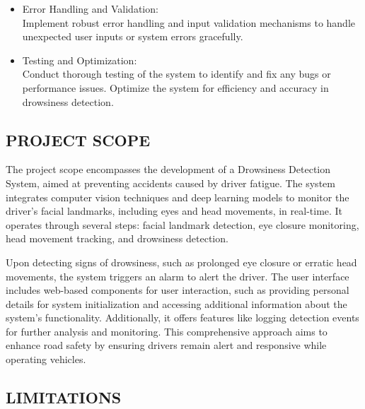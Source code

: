 \documentclass[12pt]{article}
\begin{document}
\begin{itemize}
\item Error Handling and Validation:\\ Implement robust error handling and input validation mechanisms to handle unexpected user inputs or system errors gracefully.

\item Testing and Optimization:\\ Conduct thorough testing of the system to identify and fix any bugs or performance issues. Optimize the system for efficiency and accuracy in drowsiness detection.
\end{itemize}

\subsection{PROJECT SCOPE }

The project scope encompasses the development of a Drowsiness Detection System, aimed at preventing accidents caused by driver fatigue. The system integrates computer vision techniques and deep learning models to monitor the driver's facial landmarks, including eyes and head movements, in real-time. It operates through several steps: facial landmark detection, eye closure monitoring, head movement tracking, and drowsiness detection. 

Upon detecting signs of drowsiness, such as prolonged eye closure or erratic head movements, the system triggers an alarm to alert the driver. The user interface includes web-based components for user interaction, such as providing personal details for system initialization and accessing additional information about the system's functionality. Additionally, it offers features like logging detection events for further analysis and monitoring. This comprehensive approach aims to enhance road safety by ensuring drivers remain alert and responsive while operating vehicles.

\subsection{LIMITATIONS}
\end{document}
